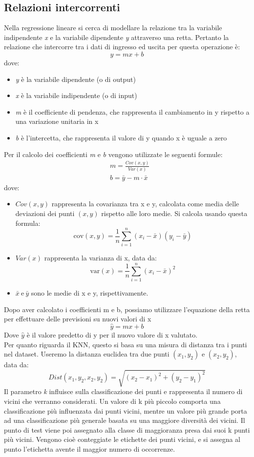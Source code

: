 \documentclass[11pt]{article}
\theoremstyle{definition}
\begin{document}
\subsection{Relazioni intercorrenti}
Nella regressione lineare si cerca di modellare la relazione tra la variabile indipendente \textit{x} e la variabile dipendente \textit{y} attraverso una retta. Pertanto la relazione che intercorre tra i dati di ingresso ed uscita per questa operazione è:
$$
y=mx+b
$$
dove:
\begin{itemize}
\item \textit{y} è la variabile dipendente (o di output)
\item \textit{x} è la variabile indipendente (o di input)
\item \textit{m} è il coefficiente di pendenza, che rappresenta il cambiamento in y rispetto a una variazione unitaria in x
\item \textit{b} è l'intercetta, che rappresenta il valore di y quando x è uguale a zero
\end{itemize}
Per il calcolo dei coefficienti \textit{m} e \textit{b} vengono utilizzate le seguenti formule:
\begin{align*}
&m = \frac{Cov(x,y)}{Var(x)}\\
&b=\bar{y}-m\cdot \bar{x}
\end{align*}
dove:
\begin{itemize}
\item $Cov(x,y)$ rappresenta la covarianza tra x e y, calcolata come media delle deviazioni dei punti $(x,y)$ rispetto alle loro medie. Si calcola usando questa formula:
$$
\text{cov}(x, y) = \frac{1}{n} \sum_{i=1}^{n} (x_i - \bar{x})(y_i - \bar{y})
$$
\item $Var(x)$ rappresenta la varianza di x, data da:
$$
\text{var}(x) = \frac{1}{n} \sum_{i=1}^{n} (x_i - \bar{x})^2
$$
\item $\bar{x} \ \text{e} \ \bar{y}$ sono le medie di x e y, rispettivamente.
\end{itemize}
Dopo aver calcolato i coefficienti m e b, possiamo utilizzare l'equazione della retta per effettuare delle previsioni su nuovi valori di x
$$
\hat{y} = mx+b
$$
Dove $\hat{y}$ è il valore predetto di y per il nuovo valore di x valutato.  \\
\newline
Per quanto riguarda il KNN, questo si basa su una misura di distanza tra i punti nel dataset. Useremo la distanza euclidea tra due punti $(x_1,y_2)$ e $(x_2,y_2)$, data da:
$$
Dist(x_1,y_2,x_2,y_2)=\sqrt{(x_2-x_1)^2 + (y_2-y_1)^2}
$$ 
Il parametro \textit{k} influisce sulla classificazione dei punti e rappresenta il numero di vicini che verranno considerati. Un valore di k più piccolo comporta una classificazione più influenzata dai punti vicini, mentre un valore più grande porta ad una classificazione più generale basata su una maggiore diversità dei vicini. Il punto di test viene poi assegnato alla classe di maggioranza presa dai suoi k punti più vicini. Vengono cioè conteggiate le etichette dei punti vicini, e si assegna al punto l'etichetta avente il maggior numero di occorrenze.
\end{document}
